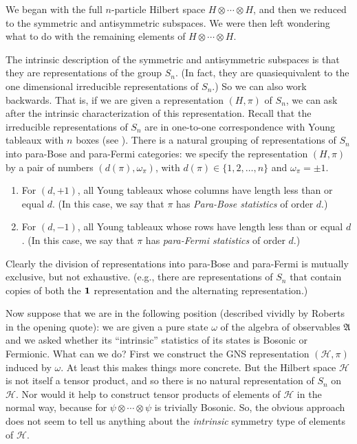 \documentclass[12pt]{article}
\theoremstyle{definition}
\theoremstyle{definition}
\theoremstyle{remark}
\def\2#1{{\mathcal #1}}
\def\1#1{{\bf #1}}
\def\al#1{{\mathfrak #1}}
\def\om{\omega} \def\Om{\Omega} \def\dd{\partial} \def\D{\Delta}
\begin{document}
We began with the full $n$-particle Hilbert space $H\otimes \cdots
\otimes H$, and then we reduced to the symmetric and antisymmetric
subspaces.  We were then left wondering what to do with the remaining
elements of $H\otimes \cdots \otimes H$.  

The intrinsic description of the symmetric and antisymmetric subspaces
is that they are representations of the group $S_n$.  (In fact, they
are quasiequivalent to the one dimensional irreducible representations
of $S_n$.)  So we can also work backwards.  That is, if we are given a
representation $(H,\pi )$ of $S_n$, we can ask after the intrinsic
characterization of this representation.  Recall that the irreducible
representations of $S_n$ are in one-to-one correspondence with Young
tableaux with $n$ boxes (see \cite{simon}).  There is a natural
grouping of representations of $S_n$ into para-Bose and para-Fermi
categories: we specify the representation $(H,\pi )$ by a pair of
numbers $(d(\pi ),\om _\pi )$, with $d(\pi )\in \{ 1,2,\dots ,n\}$ and
$\om _\pi =\pm 1$.
\begin{enumerate}
\item For $(d,+1)$, all Young tableaux whose columns have length less
  than or equal $d$. (In this case, we say that $\pi$ has
  \emph{Para-Bose statistics} of order $d$.)
\item For $(d,-1)$, all Young tableaux whose rows have length less
  than or equal $d$.  (In this case, we say that $\pi$ has
  \emph{para-Fermi statistics} of order $d$.)
\end{enumerate}
Clearly the division of representations into para-Bose and para-Fermi
is mutually exclusive, but not exhaustive.  (e.g., there are
representations of $S_n$ that contain copies of both the $\11$
representation and the alternating representation.)

Now suppose that we are in the following position
(described vividly by Roberts in the opening quote): we
are given a pure state $\om$ of the algebra of
observables $\al A$ and we asked whether its
``intrinsic'' statistics of its states is Bosonic or
Fermionic.  What can we do?  First we construct the GNS
representation $(\2H ,\pi )$ induced by $\om$.  At
least this makes things more concrete.  But the Hilbert
space $\2H$ is not itself a tensor product, and so
there is no natural representation of $S_n$ on $\2H$.
Nor would it help to construct tensor products of
elements of $\2H$ in the normal way, because for $\psi
\otimes \cdots \otimes \psi$ is trivially Bosonic.  So,
the obvious approach does not seem to tell us anything
about the \emph{intrinsic} symmetry type of elements of
$\2H$.
\end{document}
